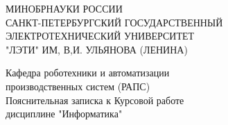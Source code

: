 \documentclass[russian,utf8,nocolumxxxi,nocolumnxxxii]{eskdtext}
\begin{document}
\hfill \break
\begin{center}
    

\large{МИНОБРНАУКИ РОССИИ}\\
\footnotesize{САНКТ-ПЕТЕРБУРГСКИЙ ГОСУДАРСТВЕННЫЙ}\\
\footnotesize{ЭЛЕКТРОТЕХНИЧЕСКИЙ  УНИВЕРСИТЕТ}\\
\footnotesize{"ЛЭТИ" ИМ, В,И. УЛЬЯНОВА (ЛЕНИНА)}\\
\hfill \break


\hfill \break
\normalsize{Кафедра роботехники и автоматизации\\ производственных систем (РАПС)}\\
\hfill\break
\hfill \break
\hfill \break
\hfill \break
\large{Пояснительная записка к Курсовой работе}\\
 дисциплине "Информатика"\\
\end{center}
\hfill \break
\hfill \break


\hfill \break
\hfill \break
\end{document}
